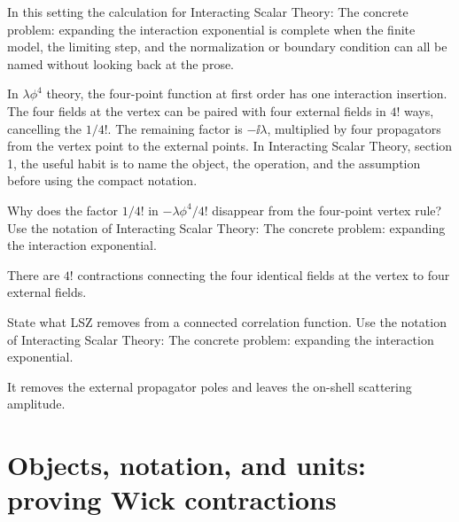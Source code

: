 In this setting the calculation for Interacting Scalar Theory: The concrete problem: expanding the interaction exponential is complete when the finite model, the limiting step, and the normalization or boundary condition can all be named without looking back at the prose.




\begin{example}
In \(\lambda\phi^4\) theory, the four-point function at first order has one interaction insertion.  The four fields at the vertex can be paired with four external fields in \(4!\) ways, cancelling the \(1/4!\).  The remaining factor is \(-\ii\lambda\), multiplied by four propagators from the vertex point to the external points.  In Interacting Scalar Theory, section 1, the useful habit is to name the object, the operation, and the assumption before using the compact notation.
\end{example}



\begin{exercise}
Why does the factor \(1/4!\) in \(-\lambda\phi^4/4!\) disappear from the four-point vertex rule?  Use the notation of Interacting Scalar Theory: The concrete problem: expanding the interaction exponential.
\begin{answer}
There are \(4!\) contractions connecting the four identical fields at the vertex to four external fields.
\end{answer}
\end{exercise}

\begin{exercise}
State what LSZ removes from a connected correlation function.  Use the notation of Interacting Scalar Theory: The concrete problem: expanding the interaction exponential.
\begin{answer}
It removes the external propagator poles and leaves the on-shell scattering amplitude.
\end{answer}
\end{exercise}



\section{Objects, notation, and units: proving Wick contractions}













